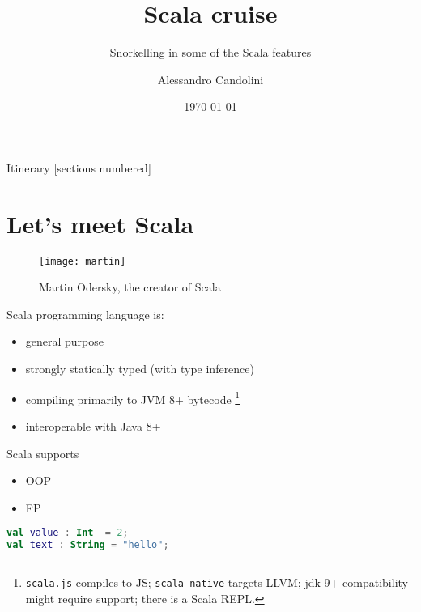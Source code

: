 \documentclass[10pt]{beamer}
\title{Scala cruise}
\subtitle{Snorkelling in some of the Scala features}
\date{\today}
\author[A. Candolini]{Alessandro Candolini}
\begin{document}
\maketitle

\begin{frame}{Itinerary}
  [sections numbered]
  \tableofcontents[hideallsubsections]
\end{frame}

\section{Let's meet Scala}

\begin{frame}
\begin{figure}
\centering
\texttt{[image: martin]}
\caption{Martin Odersky, the creator of Scala}
\end{figure}
\end{frame}


\begin{frame}[fragile]
Scala programming language is:
\begin{itemize}
\item general purpose 
\item strongly statically typed (with type inference) 
\item compiling primarily to JVM 8+ bytecode%
\footnote{\texttt{scala.js} compiles to JS; \texttt{scala native} targets LLVM; jdk 9+ compatibility might require support; there is a Scala REPL.}
\item interoperable with Java 8+
\end{itemize}
\end{frame}

\begin{frame}
Scala supports 
\begin{itemize}
\item OOP
\item FP 
\end{itemize}
\end{frame}

\begin{frame}[fragile]
\begin{lstlisting}[language=Kotlin, basicstyle=\ttfamily]
val value : Int  = 2;
val text : String = "hello";
\end{lstlisting}
\end{frame}
\end{document}
